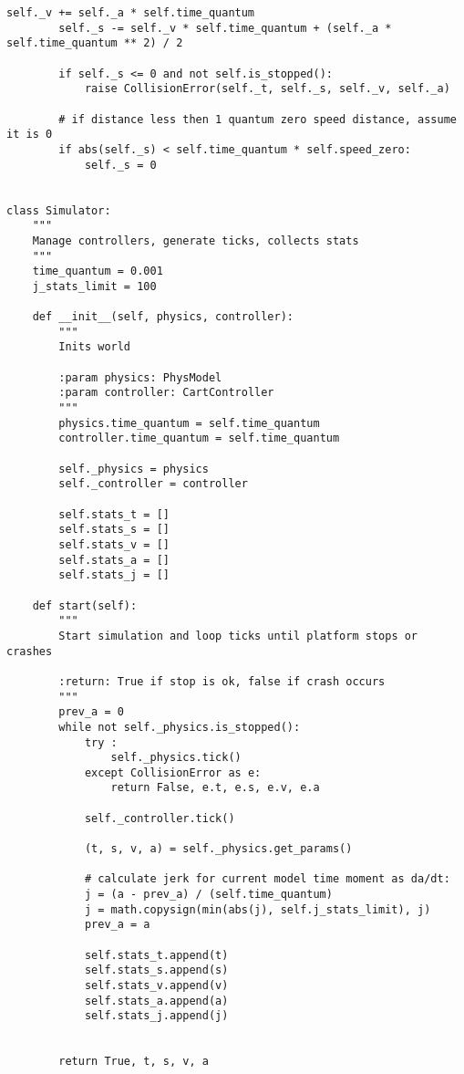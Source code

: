 \begin{lstlisting}[style=pythonstyle,caption={ }, label=lst:func:1]
		self._v += self._a * self.time_quantum
		self._s -= self._v * self.time_quantum + (self._a * self.time_quantum ** 2) / 2

		if self._s <= 0 and not self.is_stopped():
			raise CollisionError(self._t, self._s, self._v, self._a)

		# if distance less then 1 quantum zero speed distance, assume it is 0
		if abs(self._s) < self.time_quantum * self.speed_zero:
			self._s = 0


class Simulator:
	"""
	Manage controllers, generate ticks, collects stats
	"""
	time_quantum = 0.001
	j_stats_limit = 100

	def __init__(self, physics, controller):
		"""
		Inits world

		:param physics: PhysModel
		:param controller: CartController
		"""
		physics.time_quantum = self.time_quantum
		controller.time_quantum = self.time_quantum

		self._physics = physics
		self._controller = controller

		self.stats_t = []
		self.stats_s = []
		self.stats_v = []
		self.stats_a = []
		self.stats_j = []

	def start(self):
		"""
		Start simulation and loop ticks until platform stops or crashes

		:return: True if stop is ok, false if crash occurs
		"""
		prev_a = 0
		while not self._physics.is_stopped():
			try :
				self._physics.tick()
			except CollisionError as e:
				return False, e.t, e.s, e.v, e.a

			self._controller.tick()

			(t, s, v, a) = self._physics.get_params()

			# calculate jerk for current model time moment as da/dt:
			j = (a - prev_a) / (self.time_quantum)
			j = math.copysign(min(abs(j), self.j_stats_limit), j)
			prev_a = a

			self.stats_t.append(t)
			self.stats_s.append(s)
			self.stats_v.append(v)
			self.stats_a.append(a)
			self.stats_j.append(j)


		return True, t, s, v, a
\end{lstlisting}